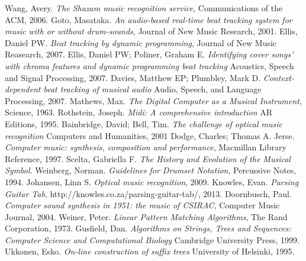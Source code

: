 \documentclass[12pt,twoside,notitlepage]{report}
\begin{document}
\cleardoublepage



\begin{thebibliography}{99}
	Wang, Avery.
	\emph{The Shazam music recognition service},
	Communications of the ACM,
	2006.
	Goto, Masataka.
	\emph{An audio-based real-time beat tracking system for music with or without drum-sounds},
	Journal of New Music Research,
	2001.
	Ellis, Daniel PW.
	\emph{Beat tracking by dynamic programming},
	Journal of New Music Reasearch,
	2007.
	Ellis, Daniel PW; Poliner, Graham E.
	\emph{Identifying cover songs' with chroma features and dynamic programming beat tracking}
	Acoustics, Speech and Signal Processing,
	2007.
	Davies, Matthew EP; Plumbley, Mark D.
	\emph{Context-dependent beat tracking of musical audio}
	Audio, Speech, and Language Processing,
	2007.
	Mathews, Max.
	\emph{The Digital Computer as a Musical Instrument},
	Science,
	1963.
	Rothstein, Joseph.
	\emph{Midi: A comprehensive introduction}
	AR Editions,
	1995.
	Bainbridge, David; Bell, Tim.
	\emph{The challenge of optical music recognition}
	Computers and Humanities,
	2001
	Dodge, Charles; Thomas A. Jerse.
	\emph{Computer music: synthesis, composition and performance},
	Macmillan Library Reference, 
	1997.
	Scelta, Gabriella F.
	\emph{The History and Evolution of the Musical Symbol}.
	Weinberg, Norman.
	\emph{Guidelines for Drumset Notation},
	Percussive Notes,
	1994.
	Johansen, Linn S.
	\emph{Optical music recognition},
	2009.	
	Knowles, Evan.
	\emph{Parsing Guitar Tab},
	http://knowles.co.za/parsing-guitar-tab/,
	2013.
	Doornbusch, Paul.
	\emph{Computer sound synthesis in 1951: the music of CSIRAC},
	Computer Music Journal,
	2004.
	Weiner, Peter.
	\emph{Linear Pattern Matching Algorithms},
	The Rand Corporation,
	1973.
	Gusfield, Dan.
	\emph{Algorithms on Strings, Trees and Sequences: Computer Science and Computational Biology}
	Cambridge University Press,
	1999.
	Ukkonen, Esko.
	\emph{On-line construction of suffix trees}
	University of Helsinki,
	1995.


\end{thebibliography}
\cleardoublepage

\appendix
\end{document}
